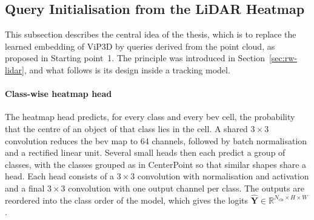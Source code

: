 


\subsection{Query Initialisation from the LiDAR Heatmap}
\label{sec:design-init}

This subsection describes the central idea of the thesis, which is to replace the learned embedding of ViP3D
by queries derived from the point cloud, as proposed in Starting point~1. The principle was introduced in
Section~\ref{sec:rw-lidar}, and what follows is its design inside a tracking model.

\paragraph{Class-wise heatmap head}
\label{subsec:design-heatmap}

The heatmap head predicts, for every class and every \ac{bev} cell, the probability that the centre of an
object of that class lies in the cell. A shared $3 \times 3$ convolution reduces the \ac{bev} map to 64
channels, followed by batch normalisation and a rectified linear unit. Several small heads then each predict
a group of classes, with the classes grouped as in CenterPoint \cite{Yin2021CenterPoint} so that similar
shapes share a head. Each head consists of a $3 \times 3$ convolution with normalisation and activation and a
final $3 \times 3$ convolution with one output channel per class. The outputs are reordered into the class
order of the model, which gives the logits $\hat{\mathbf{Y}} \in \mathbb{R}^{N_{\mathrm{cls}} \times H
\times W}$. 


